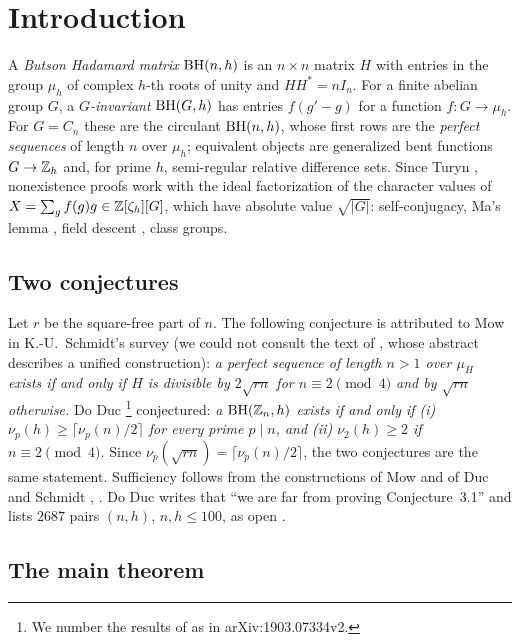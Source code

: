 \section{Introduction}\label{sec:intro}

A \emph{Butson Hadamard matrix} $\operatorname{BH}(n,h)$ \cite{Butson1962} is an
$n\times n$ matrix $H$ with entries in the group $\mu_h$ of complex
$h$-th roots of unity and $HH^*=nI_n$. For a finite abelian group $G$, a
\emph{$G$-invariant} $\operatorname{BH}(G,h)$ has entries $f(g'-g)$ for a function
$f:G\to\mu_h$. For $G=C_n$ these are the circulant $\operatorname{BH}(n,h)$, whose
first rows are the \emph{perfect sequences} of length $n$ over $\mu_h$;
equivalent objects are generalized bent functions $G\to\mathbb{Z}_h$ and, for
prime $h$, semi-regular relative difference sets. Since Turyn
\cite{Turyn1965}, nonexistence proofs work with the ideal factorization
of the character values of $X=\sum_gf(g)g\in\mathbb{Z}[\zeta_h][G]$, which have
absolute value $\sqrt{|G|}$: self-conjugacy, Ma's lemma
\cite{Ma1985,Pott1995}, field descent \cite{Schmidt1999}, class groups.

\subsection{Two conjectures}\label{ssec:conj}
Let $r$ be the square-free part of $n$. The following conjecture is
attributed to Mow \cite{Mow1995} in K.-U.~Schmidt's survey
\cite[Conj.~4.1.1]{Schmidt2016survey} (we could not consult the text of
\cite{Mow1995}, whose abstract describes a unified construction):
\emph{a perfect sequence of length $n>1$ over $\mu_H$ exists if and only
if $H$ is divisible by $2\sqrt{rn}$ for $n\equiv2\pmod4$ and by
$\sqrt{rn}$ otherwise.} Do Duc \cite[Conj.~3.1]{DoDuc2019}\footnote{We
number the results of \cite{DoDuc2019} as in arXiv:1903.07334v2.}
conjectured:
\emph{a $\operatorname{BH}(\mathbb{Z}_n,h)$ exists if and only if (i)
$\nu_p(h)\ge\lceil\nu_p(n)/2\rceil$ for every prime $p\mid n$, and (ii)
$\nu_2(h)\ge2$ if $n\equiv2\pmod4$.} Since
$\nu_p(\sqrt{rn})=\lceil\nu_p(n)/2\rceil$, the two conjectures are the
same statement. Sufficiency follows from the constructions of Mow and of
Duc and Schmidt \cite[Cor.~2.5]{DucSchmidt2019}, \cite[Result~4.1]{DoDuc2019}. Do Duc writes that ``we are
far from proving Conjecture~3.1'' and lists $2687$ pairs $(n,h)$,
$n,h\le100$, as open \cite[Remark~3.13]{DoDuc2019}.

\subsection{The main theorem}

